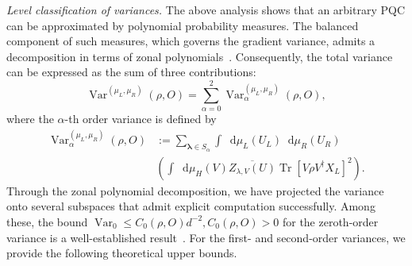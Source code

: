\documentclass[%
 superscriptaddress,
 aps,prl,
 reprint,
 twocolumn,
 amsmath,amssymb,showpacs,
 bibnotes,
]{revtex4-2}
\newcommand*{\dif}{\mathop{}\!\mathrm{d}}
\begin{document}
\emph{Level classification of variances.}
The above analysis shows that an arbitrary PQC can be approximated by polynomial probability measures. The balanced component of such measures, which governs the gradient variance, admits a decomposition in terms of zonal polynomials~\cite{james1961zonal,james1964distributions,constantine1963some}. Consequently, the total variance can be expressed as the sum of three contributions:
\begin{equation}
    \operatorname{Var}^{(\mu_L, \mu_R)}(\rho, O) = \sum_{\alpha=0}^2 \operatorname{Var}_\alpha^{(\mu_L, \mu_R)}(\rho, O),
    \label{eq:var_decomp}
\end{equation}
where the $\alpha$-th order variance is defined by
\begin{equation}
    \begin{aligned}
        \operatorname{Var}_\alpha^{(\mu_L, \mu_R)}(\rho, O)&:=\sum_{\boldsymbol{\lambda}\in S_
        \alpha}\int\dif\mu_L(U_L)\dif\mu_R(U_R)\\
        &\left(\int\dif\mu_H(V)\overline{Z_{\lambda,V}(U)}\operatorname{Tr}[V\rho V^\dagger X_L]^2\right).
    \end{aligned}
    \label{eq:nth-var}
\end{equation}
Through the zonal polynomial decomposition, we have projected the variance onto several subspaces that admit explicit computation successfully. Among these, the bound $\operatorname{Var}_0 \leq C_0(\rho,O) d^{-2}, C_0(\rho,O)>0$ for the zeroth-order variance is a well-established result~\cite{mcclean2018barren}. For the first- and second-order variances, we provide the following theoretical upper bounds.
\end{document}
